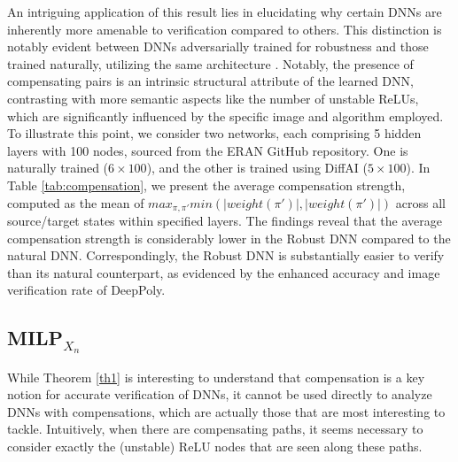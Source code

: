 
An intriguing application of this result lies in elucidating why certain DNNs are inherently more amenable to verification compared to others. This distinction is notably evident between DNNs adversarially trained for robustness and those trained naturally, utilizing the same architecture \cite{deeppoly,prima,crown}. Notably, the presence of compensating pairs is an intrinsic structural attribute of the learned DNN, contrasting with more semantic aspects like the number of unstable ReLUs, which are significantly influenced by the specific image and algorithm employed. To illustrate this point, we consider two networks, each comprising 5 hidden layers with 100 nodes, sourced from the ERAN GitHub repository. One is naturally trained ($6\times100$), and the other is trained using DiffAI ($5\times100$). In Table \ref{tab:compensation}, we present the average compensation strength, computed as the mean of $max_{\pi,\pi'} min(|weight(\pi')|,|weight(\pi')|)$ across all source/target states within specified layers. The findings reveal that the average compensation strength is considerably lower in the Robust DNN compared to the natural DNN. Correspondingly, the Robust DNN is substantially easier to verify than its natural counterpart, as evidenced by the enhanced accuracy and image verification rate of DeepPoly.


\subsection{MILP$_{X_n}$}



While Theorem \ref{th1} is interesting to understand that compensation is a key notion for accurate verification of DNNs, it cannot be used directly to analyze DNNs with compensations, which are actually those that are most interesting to tackle.
Intuitively, when there are compensating paths, it seems necessary to consider exactly the (unstable) ReLU nodes that are seen along these paths. 

